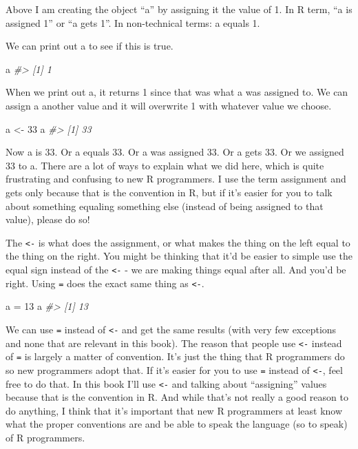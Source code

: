 \documentclass[
]{krantz}
\makeatletter
\newenvironment{Shaded}{\begin{snugshade}}{\end{snugshade}}
\newcommand{\CommentTok}[1]{\textcolor[rgb]{0.37,0.37,0.37}{\textit{#1}}}
\newcommand{\DecValTok}[1]{\textcolor[rgb]{0.06,0.06,0.06}{#1}}
\newcommand{\NormalTok}[1]{#1}
\newcommand{\OtherTok}[1]{\textcolor[rgb]{0.37,0.37,0.37}{#1}}
\newenvironment{kframe}{%
\medskip{}
\setlength{\fboxsep}{.8em}
 \def\at@end@of@kframe{}%
 \ifinner\ifhmode%
  \def\at@end@of@kframe{\end{minipage}}%
  \begin{minipage}{\columnwidth}%
 \fi\fi%
 \def\FrameCommand##1{\hskip\@totalleftmargin \hskip-\fboxsep
 \colorbox{shadecolor}{##1}\hskip-\fboxsep
     \hskip-\linewidth \hskip-\@totalleftmargin \hskip\columnwidth}%
 \MakeFramed {\advance\hsize-\width
   \@totalleftmargin\z@ \linewidth\hsize
   \@setminipage}}%
 {\par\unskip\endMakeFramed%
 \at@end@of@kframe}
\renewenvironment{Shaded}{\begin{kframe}}{\end{kframe}}
\makeatother
\begin{document}
Above I am creating the object ``a'' by assigning it the value of 1. In R term, ``a is assigned 1'' or ``a gets 1''. In non-technical terms: a equals 1.

We can print out a to see if this is true.

\begin{Shaded}
\begin{Highlighting}[]
\NormalTok{a}
\CommentTok{\#\textgreater{} [1] 1}
\end{Highlighting}
\end{Shaded}

When we print out a, it returns 1 since that was what a was assigned to. We can assign a another value and it will overwrite 1 with whatever value we choose.

\begin{Shaded}
\begin{Highlighting}[]
\NormalTok{a }\OtherTok{\textless{}{-}} \DecValTok{33}
\NormalTok{a}
\CommentTok{\#\textgreater{} [1] 33}
\end{Highlighting}
\end{Shaded}

Now a is 33. Or a equals 33. Or a was assigned 33. Or a gets 33. Or we assigned 33 to a. There are a lot of ways to explain what we did here, which is quite frustrating and confusing to new R programmers. I use the term assignment and gets only because that is the convention in R, but if it's easier for you to talk about something equaling something else (instead of being assigned to that value), please do so!

The \texttt{\textless{}-} is what does the assignment, or what makes the thing on the left equal to the thing on the right. You might be thinking that it'd be easier to simple use the equal sign instead of the \texttt{\textless{}-} - we are making things equal after all. And you'd be right. Using \texttt{=} does the exact same thing as \texttt{\textless{}-}.

\begin{Shaded}
\begin{Highlighting}[]
\NormalTok{a }\OtherTok{=} \DecValTok{13}
\NormalTok{a}
\CommentTok{\#\textgreater{} [1] 13}
\end{Highlighting}
\end{Shaded}

We can use \texttt{=} instead of \texttt{\textless{}-} and get the same results (with very few exceptions and none that are relevant in this book). The reason that people use \texttt{\textless{}-} instead of \texttt{=} is largely a matter of convention. It's just the thing that R programmers do so new programmers adopt that. If it's easier for you to use \texttt{=} instead of \texttt{\textless{}-}, feel free to do that. In this book I'll use \texttt{\textless{}-} and talking about ``assigning'' values because that is the convention in R. And while that's not really a good reason to do anything, I think that it's important that new R programmers at least know what the proper conventions are and be able to speak the language (so to speak) of R programmers.
\end{document}

